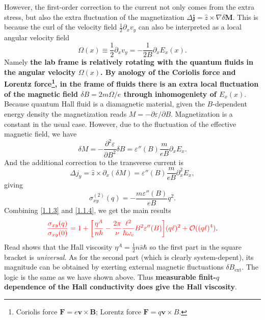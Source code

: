 \documentclass[10pt,nofootinbib,letterpaper]{revtex4}
\begin{document}
	However, the first-order correction to the current not only comes from the extra stress, but also the extra fluctuation of the magnetization $\Delta\bm{j}=\hat{z}\times\nabla\delta\bm{M}$. This is because the curl of the velocity field $\frac12 \partial_xv_y$ can also be interpreted as a local angular velocity field
	\begin{equation*}
		\Omega(x)\equiv\dfrac{1}{2}\partial_x v_y=-\dfrac{1}{2B}\partial_x E_x(x).
	\end{equation*}
	Namely \textbf{the lab frame is relatively rotating with the quantum fluids in the angular velocity $\Omega(x)$. By anology of the Coriolis force and Lorentz force\footnote{Coriolis force $\bm{F}=e\bm{v}\times\bm{B}$; Lorentz force $\bm{F}=q\bm{v}\times B$.}, in the frame of fluids there is an extra local fluctuation of the magnetic field $\delta B=2m\Omega/e$ through inhomogeniety of $E_x(x)$}. Because quantum Hall fluid is a diamagnetic material, given the $B$-dependent energy density the magnetization reads $M=-\partial \varepsilon/\partial B$. Magnetization is a constant in the usual case. However, due to the fluctuation of the effective magnetic field, we have
	\begin{equation*}
		\delta M=-\dfrac{\partial^2 \varepsilon}{\partial B^2}\delta B=\varepsilon''(B)\dfrac{m}{eB}\partial_x E_x.
	\end{equation*}
	And the additional correction to the transverse current is
	\begin{equation*}
		\Delta j_y=\hat{z}\times \partial_x(\delta M)=\varepsilon''(B)\dfrac{m}{eB}\partial_x^2 E_x,
	\end{equation*}
	giving
	\begin{equation}\label{1.1.4}
		\sigma^{(2)}_{xy}(q)=-\dfrac{m \varepsilon''(B)}{eB}q^2.
	\end{equation}
	Combining \eqref{1.1.3} and \eqref{1.1.4}, we get the main results
	\begin{equation}\label{1.1.5}
		{\color{red}\dfrac{\sigma_{xy}(q)}{\sigma_{xy}(0)}=1+\bigg[\dfrac{\eta^A}{n\hbar}-\dfrac{2\pi}{\nu}\dfrac{\ell^2}{\hbar\omega_c}B^2 \varepsilon''(B)\bigg](q\ell)^2+\mathcal{O}((q\ell)^4)}.
	\end{equation}
	Read shows \cite{read2009non} that the Hall viscosity $\eta^A=\frac{1}{2}n\bar{s}\hbar$ so the first part in the square bracket is \emph{universal}. As for the second part (which is clearly system-depent), its magnitude can be obtained by exerting external magnetic fluctuations $\delta B_{\text{ext}}$. The logic is the same as we have shown above. Thus \textbf{\color{red}measurable finit-$q$ dependence of the Hall conductivity does give the Hall viscosity}.
\end{document}
